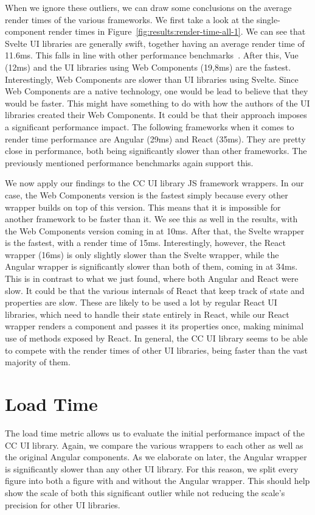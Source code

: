 When we ignore these outliers, we can draw some conclusions on the average render times of the various frameworks. We first take a look at the single-component render times in Figure~\ref{fig:results:render-time-all-1}. We can see that Svelte UI libraries are generally swift, together having an average render time of 11.6ms. This falls in line with other performance benchmarks~. After this, Vue (12ms) and the UI libraries using Web Components (19,8ms) are the fastest. Interestingly, Web Components are slower than UI libraries using Svelte. Since Web Components are a native technology, one would be lead to believe that they would be faster. This might have something to do with how the authors of the UI libraries created their Web Components. It could be that their approach imposes a significant performance impact. The following frameworks when it comes to render time performance are Angular (29ms) and React (35ms). They are pretty close in performance, both being significantly slower than other frameworks. The previously mentioned performance benchmarks again support this.

We now apply our findings to the CC UI library JS framework wrappers. In our case, the Web Components version is the fastest simply because every other wrapper builds on top of this version. This means that it is impossible for another framework to be faster than it. We see this as well in the results, with the Web Components version coming in at 10ms. After that, the Svelte wrapper is the fastest, with a render time of 15ms. Interestingly, however, the React wrapper (16ms) is only slightly slower than the Svelte wrapper, while the Angular wrapper is significantly slower than both of them, coming in at 34ms. This is in contrast to what we just found, where both Angular and React were slow. It could be that the various internals of React that keep track of state and properties are slow. These are likely to be used a lot by regular React UI libraries, which need to handle their state entirely in React, while our React wrapper renders a component and passes it its properties once, making minimal use of methods exposed by React. In general, the CC UI library seems to be able to compete with the render times of other UI libraries, being faster than the vast majority of them.

\section{Load Time}
The load time metric allows us to evaluate the initial performance impact of the CC UI library. Again, we compare the various wrappers to each other as well as the original Angular components. As we elaborate on later, the Angular wrapper is significantly slower than any other UI library. For this reason, we split every figure into both a figure with and without the Angular wrapper. This should help show the scale of both this significant outlier while not reducing the scale's precision for other UI libraries.

